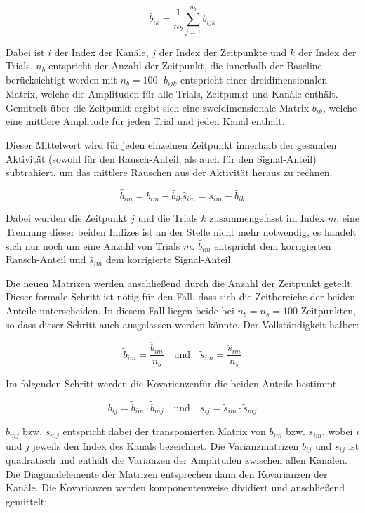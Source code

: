 \documentclass[doc,a4paper,12pt]{apa6}
\begin{document}
\begin{equation}
\bar{b}_{ik} = \frac{1}{n_b} \sum_{j=1}^{n_b} b_{ijk}
\end{equation}

Dabei ist $i$ der Index der Kanäle, $j$ der Index der Zeitpunkte und $k$ der Index der Trials. $n_b$ entspricht der Anzahl der Zeitpunkt, die innerhalb der Baseline berücksichtigt werden mit $n_b = 100$. $b_{ijk}$ entspricht einer dreidimensionalen Matrix, welche die Amplituden für alle Trials, Zeitpunkt und Kanäle enthält. Gemittelt über die Zeitpunkt ergibt sich eine zweidimensionale Matrix $b_{ik}$, welche eine mittlere Amplitude für jeden Trial und jeden Kanal enthält.

Dieser Mittelwert wird für jeden einzelnen Zeitpunkt innerhalb der gesamten Aktivität (sowohl für den Rausch-Anteil, als auch für den Signal-Anteil) subtrahiert, um das mittlere Rauschen aus der Aktivität heraus zu rechnen.

\begin{equation}
\hat{b}_{im} = b_{im} - \bar{b}_{ik}
\hat{s}_{im} = s_{im} - \bar{b}_{ik}
\end{equation}

Dabei wurden die Zeitpunkt $j$ und die Trials $k$ zusammengefasst im Index $m$, eine Trennung dieser beiden Indizes ist an der Stelle nicht mehr notwendig, es handelt sich nur noch um eine Anzahl von Trials $m$. $\hat{b}_{im}$ entspricht dem korrigierten Rausch-Anteil und $\hat{s}_{im}$ dem korrigierte Signal-Anteil.

Die neuen Matrizen werden anschließend durch die Anzahl der Zeitpunkt geteilt. Dieser formale Schritt ist nötig für den Fall, dass sich die Zeitbereiche der beiden Anteile unterscheiden. In diesem Fall liegen beide bei $n_b = n_s = 100$ Zeitpunkten, so dass dieser Schritt auch ausgelassen werden könnte. Der Vollständigkeit halber:

\begin{equation}
\tilde{b}_{im} = \frac{\hat{b}_{im}}{n_b} \quad \text{und} \quad \tilde{s}_{im} = \frac{\hat{s}_{im}}{n_s}
\end{equation}

Im folgenden Schritt werden die Kovarianzenfür die beiden Anteile bestimmt.

\begin{equation}
b_{ij} = \tilde{b}_{im} \cdot \tilde{b}_{mj} \quad \text{und} \quad s_{ij} = \tilde{s}_{im} \cdot \tilde{s}_{mj}
\end{equation}

$b_{mj}$ bzw. $s_{mj}$ entspricht dabei der transponierten Matrix von $b_{im}$ bzw. $s_{im}$, wobei $i$ und $j$ jeweils den Index des Kanals bezeichnet. Die Varianzmatrizen $b_{ij}$ und $s_{ij}$ ist quadratisch und enthält die Varianzen der Amplituden zwischen allen Kanälen. Die Diagonalelemente der Matrizen entsprechen dann den Kovarianzen der Kanäle. Die Kovarianzen werden komponentenweise dividiert und anschließend gemittelt:
\end{document}
